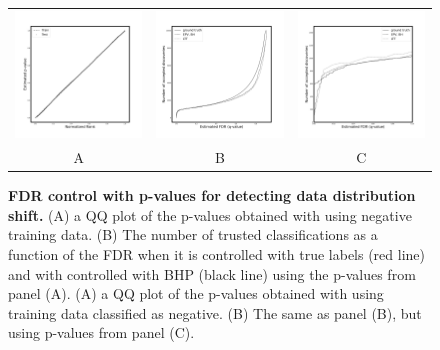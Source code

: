 \documentclass{article}
\begin{document}
\begin{figure}
    \centering
        \begin{tabular}{ccc}
 		\includegraphics[width=2in]{img/cnn_QQ_shifted.png} &
		\includegraphics[width=2in]{img/cnn_shifted_fdr_control.png} & 
            \includegraphics[width=2in]{img/cnn_shifted_fdr_control_loc.png}
		\\	
		A & B & C
	\end{tabular}
	\caption{{\bf  FDR control with p-values for detecting data distribution shift.}
		(A) a QQ plot of the p-values obtained with using negative training data. (B) The number of trusted classifications as a function of the FDR when it is controlled with true labels (red line) and with controlled with BHP (black line) using the p-values from panel (A).
		(A) a QQ plot of the p-values obtained with using training data classified as negative. (B) The same as panel (B), but using p-values from panel (C).
	}
	\label{fig:shift}
\end{figure}
\end{document}
